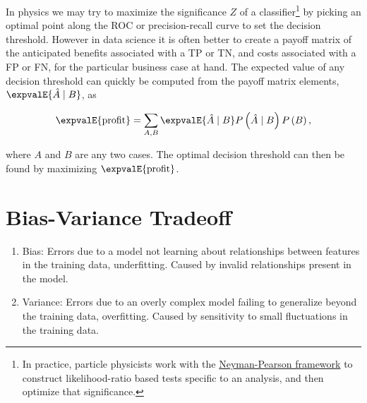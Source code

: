 
In physics we may try to maximize the significance $Z$ of a classifier\footnote{In practice,
particle physicists work with the \href{https://en.wikipedia.org/wiki/Neyman\%E2\%80\%93Pearson\_lemma}{Neyman-Pearson framework}
to construct likelihood-ratio based tests specific to an analysis, and then optimize that significance.} by
picking an optimal point along the ROC or precision-recall curve to set the decision threshold.
However in data science it is often better to create a payoff matrix of the anticipated
benefits associated with a TP or TN, and costs associated with a FP or FN,
for the particular business case at hand.
The expected value of any decision threshold can quickly be computed
from the payoff matrix elements, $\expvalE{\hat{A} \mid B}$, as

\begin{equation} \label{eq:E_profit}
\expvalE{\text{profit}} = \sum_{A,B} \expvalE{\hat{A} \mid B} P\left(\hat{A} \mid B \right) P\left(B\right),
\end{equation}

\noindent where $A$ and $B$ are any two cases.
The optimal decision threshold can then be found by maximizing $\expvalE{\text{profit}}$.

\section{Bias-Variance Tradeoff}
\label{ml_general:bias_variance_tradeoff}

\begin{enumerate}[noitemsep]
  \item Bias: Errors due to a model not learning about relationships between features in the training data, \ie underfitting. Caused by invalid relationships present in the model.
  \item Variance: Errors due to an overly complex model failing to generalize beyond the training data, \ie overfitting. Caused by sensitivity to small fluctuations in the training data.
\end{enumerate}

